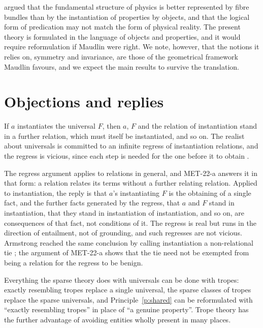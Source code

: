 \documentclass{situationist-preprint}
\begin{document}
\citet{Maudlin2007} argued that the fundamental structure of physics is better represented by fibre bundles than by the instantiation of properties by objects, and that the logical form of predication may not match the form of physical reality. The present theory is formulated in the language of objects and properties, and it would require reformulation if Maudlin were right. We note, however, that the notions it relies on, symmetry and invariance, are those of the geometrical framework Maudlin favours, and we expect the main results to survive the translation.

\section{Objections and replies}\label{s:objections}

\begin{objection}\label{o:regress}
If $a$ instantiates the universal $F$, then $a$, $F$ and the relation of instantiation stand in a further relation, which must itself be instantiated, and so on. The realist about universals is committed to an infinite regress of instantiation relations, and the regress is vicious, since each step is needed for the one before it to obtain \citep{Bradley1893}.
\end{objection}

\begin{reply}
The regress argument applies to relations in general, and MET-22-a answers it in that form: a relation relates its terms without a further relating relation. Applied to instantiation, the reply is that $a$'s instantiating $F$ is the obtaining of a single fact, and the further facts generated by the regress, that $a$ and $F$ stand in instantiation, that they stand in instantiation of instantiation, and so on, are consequences of that fact, not conditions of it. The regress is real but runs in the direction of entailment, not of grounding, and such regresses are not vicious. Armstrong reached the same conclusion by calling instantiation a non-relational tie \citep{Armstrong1997}; the argument of MET-22-a shows that the tie need not be exempted from being a relation for the regress to be benign.
\end{reply}

\begin{objection}\label{o:tropes}
Everything the sparse theory does with universals can be done with tropes: exactly resembling tropes replace a single universal, the sparse classes of tropes replace the sparse universals, and Principle~\ref{p:shared} can be reformulated with \enquote{exactly resembling tropes} in place of \enquote{a genuine property}. Trope theory has the further advantage of avoiding entities wholly present in many places.
\end{objection}
\end{document}
